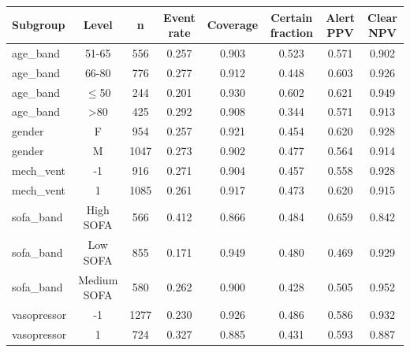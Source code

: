 \begin{tabular}{@{}lccccccc@{}}
\toprule
Subgroup & Level & n & Event rate & Coverage & Certain fraction & Alert PPV & Clear NPV\\
\midrule
age\_band & 51-65 & 556 & 0.257 & 0.903 & 0.523 & 0.571 & 0.902\\
age\_band & 66-80 & 776 & 0.277 & 0.912 & 0.448 & 0.603 & 0.926\\
age\_band & $\leq$50 & 244 & 0.201 & 0.930 & 0.602 & 0.621 & 0.949\\
age\_band & >80 & 425 & 0.292 & 0.908 & 0.344 & 0.571 & 0.913\\
gender & F & 954 & 0.257 & 0.921 & 0.454 & 0.620 & 0.928\\
gender & M & 1047 & 0.273 & 0.902 & 0.477 & 0.564 & 0.914\\
mech\_vent & -1 & 916 & 0.271 & 0.904 & 0.457 & 0.558 & 0.928\\
mech\_vent & 1 & 1085 & 0.261 & 0.917 & 0.473 & 0.620 & 0.915\\
sofa\_band & High SOFA & 566 & 0.412 & 0.866 & 0.484 & 0.659 & 0.842\\
sofa\_band & Low SOFA & 855 & 0.171 & 0.949 & 0.480 & 0.469 & 0.929\\
sofa\_band & Medium SOFA & 580 & 0.262 & 0.900 & 0.428 & 0.505 & 0.952\\
vasopressor & -1 & 1277 & 0.230 & 0.926 & 0.486 & 0.586 & 0.932\\
vasopressor & 1 & 724 & 0.327 & 0.885 & 0.431 & 0.593 & 0.887\\
\bottomrule
\end{tabular}

